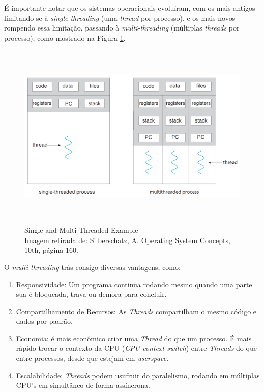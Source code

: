 É importante notar que os sistemas operacionais evoluíram, com os mais
antigos limitando-se à \emph{single-threading} (uma \emph{thread} por
processo), e os mais novos rompendo essa limitação, passando à
\emph{multi-threading} (múltiplas \emph{threads} por processo), como
mostrado na Figura \ref{fig:imagens/04/04 - single-multi-threaded.png}.


\begin{figure}[h!]
\centering
\includegraphics[keepaspectratio, width=12cm, height=9cm]{imagens/04/04 - single-multi-threaded.png}
\caption{Single and Multi-Threaded Example \\
Imagem retirada de: Silberschatz, A. Operating System Concepts, 10th,
página 160. \\}
\label{fig:imagens/04/04 - single-multi-threaded.png}
\end{figure}



O \emph{multi-threading} trás consigo diversas vantagens, como:

\begin{enumerate}
\def\labelenumi{\arabic{enumi}.}
\tightlist
\item
  Responsividade: Um programa continua rodando mesmo quando uma parte
  sua é bloqueada, trava ou demora para concluir.
\item
  Compartilhamento de Recursos: As \emph{Threads} compartilham o mesmo
  código e dados por padrão.
\item
  Economia: é mais econômico criar uma \emph{Thread} do que um processo.
  É mais rápido trocar o contexto da CPU (\emph{CPU context-switch})
  entre \emph{Threads} do que entre processos, desde que estejam em
  \emph{userspace}.
\item
  Escalabilidade: \emph{Threads} podem usufruir do paralelismo, rodando
  em múltiplas CPU's em simultâneo de forma assíncrona.
\end{enumerate}

